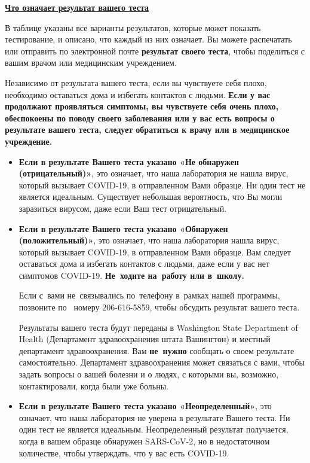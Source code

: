 \documentclass[10pt]{article}
\begin{document}
\large \underline{\textbf{Что означает результат вашего теста}}

В таблице указаны все варианты результатов, которые может показать тестирование,
и описано, что каждый из них означает. Вы можете распечатать или отправить по
электронной почте \textbf{результат своего теста}, чтобы поделиться с вашим
врачом или медицинским учреждением.

Независимо от результата вашего теста, если вы чувствуете себя плохо, необходимо
оставаться дома и избегать контактов с людьми. \textbf{Если у вас продолжают
проявляться симптомы, вы чувствуете себя очень плохо, обеспокоены по поводу
своего заболевания или у вас есть вопросы о результате вашего теста, следует
обратиться к врачу или в медицинское учреждение.}

\begin{itemize}


\item

  \textbf{Если в результате Вашего теста указано «Не обнаружен
  (отрицательный)»}, это означает, что наша лаборатория не нашла вирус, который
  вызывает COVID-19, в отправленном Вами образце. Ни один тест не является
  идеальным. Существует небольшая вероятность, что Вы могли заразиться вирусом,
  даже если Ваш тест отрицательный.

\item

  \textbf{Если в результате Вашего теста указано «Обнаружен (положительный)»},
  это означает, что наша лаборатория нашла вирус, который вызывает COVID-19, в
  отправленном Вами образце. Вам следует оставаться дома и избегать контактов с
  людьми, даже если у вас нет симптомов COVID-19. \textbf{Не ходите на работу
  или в школу.}

  Если с вами не связывались по телефону в рамках нашей программы, позвоните по 
  номеру 206-616-5859, чтобы обсудить результат вашего теста.

  Результаты вашего теста будут переданы в Washington State Department of Health
  (Департамент здравоохранения штата Вашингтон) и местный департамент
  здравоохранения. Вам \textbf{не нужно} сообщать о своем результате
  самостоятельно. Департамент здравоохранения может связаться с вами, чтобы
  задать вопросы о вашей болезни и о людях, с которыми вы, возможно,
  контактировали, когда были уже больны.

\item

  \textbf{Если в результате Вашего теста указано «Неопределенный»}, это
  означает, что наша лаборатория не уверена в результате Вашего теста. Ни один
  тест не является идеальным. Неопределенный результат получается, когда в вашем
  образце обнаружен SARS-CoV-2, но в недостаточном количестве, чтобы утверждать,
  что у вас есть COVID-19.


\end{itemize}
\end{document}
